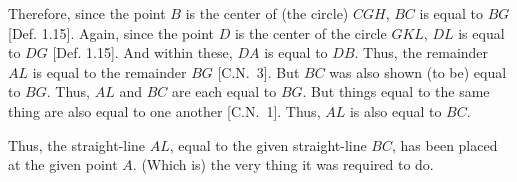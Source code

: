 \begin{Parallel}{}{}
{\epsfysize=3in
\centerline{}

Therefore, since the point $B$ is the center of (the circle) $CGH$, $BC$ is equal to 
$BG$ [Def. 1.15]. Again, since the point $D$ is the center of the circle $GKL$, $DL$ is equal to $DG$ [Def. 1.15]. And within these,  $DA$ is equal to $DB$. Thus, the remainder $AL$ is equal to the remainder $BG$ [C.N.~3]. But $BC$ was also shown (to be)  equal to $BG$. Thus,  $AL$
and $BC$ are each equal to $BG$. But things equal to the same thing are also equal to one another [C.N.~1]. Thus, $AL$ is also equal to $BC$.

Thus, the straight-line $AL$, equal to the given straight-line $BC$,
has been placed at the given point $A$. (Which is) the very thing it was required to do.}
\end{Parallel}


\vspace{7pt}{\footnotesize
\noindent $^\dag$ This proposition admits of a number
of different cases, depending on the relative positions of the point $A$
and the line $BC$. In such situations, Euclid invariably only considers one
particular case---usually, the most difficult---and leaves the remaining cases as
exercises for the reader.}

